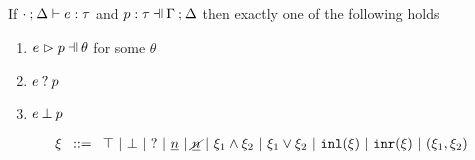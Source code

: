 \begin{lem}
  \label{lemma:match-determinism}
  If $\cdot \mathbin{;} \Delta \vdash e : \tau$ and $\hpattyp{p}{\tau}{\Gamma}{\Delta}$ then exactly one of the following holds
  \begin{enumerate}
    \item $\hpatmatch{e}{p}{\theta}$ for some $\theta$
    \item $e \mathbin{?} p$
    \item $e \mathbin{\bot} p$
  \end{enumerate}
\end{lem}

\begin{figure}[p]
$\arraycolsep=4pt\begin{array}{lll}
\xi & ::= &
  \ctruth ~\vert~
  \cfalsity ~\vert~
  \cunknown ~\vert~
  \cnum{n} ~\vert~
  \cnotnum{n} ~\vert~
  \cand{\xi_1}{\xi_2} ~\vert~
  \cor{\xi_1}{\xi_2} ~\vert~
  \cinl{\xi} ~\vert~
  \cinr{\xi} ~\vert~
  \cpair{\xi_1}{\xi_2}
\end{array}$
\end{figure}

